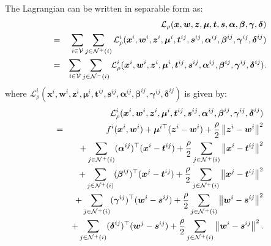 \documentclass[11pt,a4paper]{article}
\theoremstyle{plain}
\theoremstyle{definition}
\theoremstyle{remark}
\begin{document}
	The Lagrangian can be written in separable form as:
	\begin{eqnarray*}
		&&\mathcal{L}_{\rho }(\boldsymbol{x},\boldsymbol{w},\boldsymbol{z},%
		\boldsymbol{\mu },\boldsymbol{t},\boldsymbol{s},\boldsymbol{\alpha },%
		\boldsymbol{\beta },\boldsymbol{\gamma },\boldsymbol{\delta }) \\
		&=&\sum_{i\in \mathcal{V}}\sum_{j\in \mathcal{N}^{+}(i)}\mathcal{L}_{\rho
		}^{i}(\boldsymbol{x}^{i},\boldsymbol{w}^{i},\boldsymbol{z}^{i},\boldsymbol{%
			\mu }^{i},\boldsymbol{t}^{ij},\boldsymbol{s}^{ij},\boldsymbol{\alpha }^{ij},%
		\boldsymbol{\beta }^{ij},\boldsymbol{\gamma }^{ij},\boldsymbol{\delta }^{ij})
		\\
		&=&\sum_{i\in \mathcal{V}}\sum_{j\in \mathcal{N}^{-}(i)}\mathcal{L}_{\rho
		}^{i}(\boldsymbol{x}^{i},\boldsymbol{w}^{i},\boldsymbol{z}^{i},\boldsymbol{%
			\mu }^{i},\boldsymbol{t}^{ij},\boldsymbol{s}^{ij},\boldsymbol{\alpha }^{ij},%
		\boldsymbol{\beta }^{ij},\boldsymbol{\gamma }^{ij},\boldsymbol{\delta }%
		^{ij}).
	\end{eqnarray*}
	where $\mathcal{L}_{\rho}^i(\boldsymbol{x}^i, \boldsymbol{w}^i, \boldsymbol{z%
	}^i, \boldsymbol{\mu}^i, \boldsymbol{t}^{ij}, \boldsymbol{s}^{ij}, 
	\boldsymbol{\alpha}^{ij}, \boldsymbol{\beta}^{ij}, \boldsymbol{\gamma}^{ij}, 
	\boldsymbol{\delta}^{ij}) $ is given by:
	\begin{eqnarray*}
		&&\mathcal{L}_{\rho }^{i}(\boldsymbol{x}^{i},\boldsymbol{w}^{i},\boldsymbol{z%
		}^{i},\boldsymbol{\mu }^{i},\boldsymbol{t}^{ij},\boldsymbol{s}^{ij},%
		\boldsymbol{\alpha }^{ij},\boldsymbol{\beta }^{ij},\boldsymbol{\gamma }^{ij},%
		\boldsymbol{\delta }^{ij}) \\
		&=&f^{i}(\boldsymbol{x}^{i},\boldsymbol{w}^{i})+\boldsymbol{\mu }^{i\top }(%
		\boldsymbol{z}^{i}-\boldsymbol{w}^{i})+\frac{\rho }{2}\left\Vert \boldsymbol{%
			z}^{i}-\boldsymbol{w}^{i}\right\Vert ^{2} \\
		&&+\sum_{j\in \mathcal{N}^{+}(i)}(\boldsymbol{\alpha }^{ij})^{\top }(%
		\boldsymbol{x}^{i}-\boldsymbol{t}^{ij})+\frac{\rho }{2}\sum_{j\in \mathcal{N}%
			^{+}(i)}\left\Vert \boldsymbol{x}^{i}-\boldsymbol{t}^{ij}\right\Vert^{2} \\
		&&+\sum_{j\in \mathcal{N}^{+}(i)}(\boldsymbol{\beta }^{ij})^{\top }(%
		\boldsymbol{x}^{j}-\boldsymbol{t}^{ij})+\frac{\rho }{2}\sum_{j\in \mathcal{N}%
			^{+}(i)}\left\Vert \boldsymbol{x}^{j}-\boldsymbol{t}^{ij}\right\Vert^{2} \\
		&&+\sum_{j\in \mathcal{N}^{+}(i)}(\boldsymbol{\gamma }^{ij})^{\top }(%
		\boldsymbol{w}^{i}-\boldsymbol{s}^{ij})+\frac{\rho }{2}\sum_{j\in \mathcal{N}%
			^{+}(i)}\left\Vert \boldsymbol{w}^{i}-\boldsymbol{s}^{ij}\right\Vert^{2} \\
		&&+\sum_{j\in \mathcal{N}^{+}(i)}(\boldsymbol{\delta }^{ij})^{\top }(%
		\boldsymbol{w}^{j}-\boldsymbol{s}^{ij})+\frac{\rho }{2}\sum_{j\in \mathcal{N}%
			^{+}(i)}\left\Vert \boldsymbol{w}^{i}-\boldsymbol{s}^{ij}\right\Vert^{2}.
	\end{eqnarray*}
\end{document}
